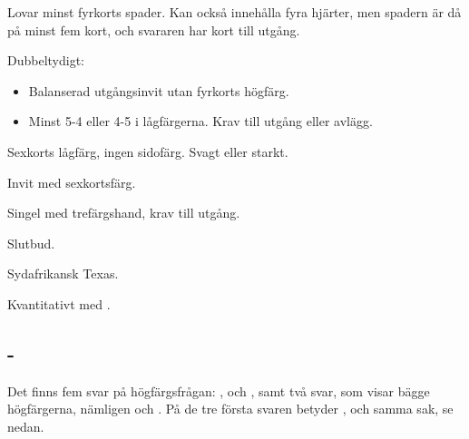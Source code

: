   \item[-\hj{2}] Lovar minst fyrkorts spader. Kan ocks{\aa} inneh{\aa}lla
                 fyra hj\"arter, men spadern \"ar d{\aa} p{\aa} minst fem kort,
                 och svararen har kort till utg{\aa}ng.
  \item[-\spa{2}] Dubbeltydigt:
               \begin{itemize}
                  \item Balanserad utg{\aa}ngsinvit utan fyrkorts h\"ogf\"arg.
                  \item Minst 5-4 eller 4-5 i l{\aa}gf\"argerna. Krav till
                        utg{\aa}ng eller avl\"agg.
               \end{itemize}
  \item[-\NT{2}] Sexkorts l{\aa}gf\"arg, ingen sidof\"arg. Svagt eller starkt.
  \item[-\la{3}] Invit med sexkortsf\"arg.
  \item[-\ho{3}] Singel med tref\"argshand, krav till utg{\aa}ng.
  \item[-\NT{3}, -\ho{4}] Slutbud.
  \item[-\la{4}] Sydafrikansk Texas.
  \item[-\NT{4}] Kvantitativt med .
\ebe

\subsection{ - }
Det finns fem svar p{\aa} h\"ogf\"argsfr{\aa}gan: ,  och
, samt tv{\aa} svar, som visar b\"agge h\"ogf\"argerna,
n\"amligen  och .
P{\aa} de tre f\"orsta svaren betyder ,  och  samma
sak, se nedan.

